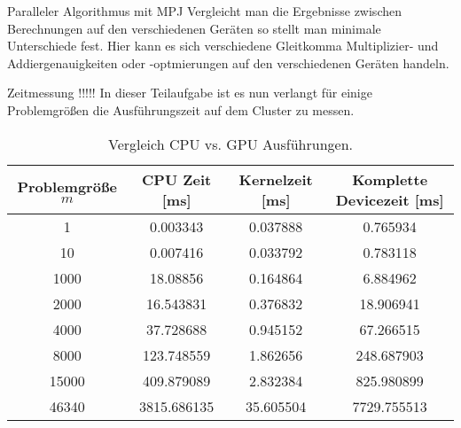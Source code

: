 \documentclass[
ngerman,
subtask=ruled %
]{tudaexercise}
\begin{document}
\begin{task}{Paralleler Algorithmus mit MPJ}
		Vergleicht man die Ergebnisse zwischen Berechnungen auf den verschiedenen Geräten so stellt man minimale Unterschiede fest. 
		Hier kann es sich verschiedene Gleitkomma Multiplizier- und Addiergenauigkeiten oder -optmierungen auf den verschiedenen Geräten handeln. 
	\end{task}
	
	\begin{task}{Zeitmessung}
		!!!!!
		In dieser Teilaufgabe ist es nun verlangt für einige Problemgrößen die Ausführungszeit auf dem Cluster zu messen.
		
		
		\begin{table}[H]
			\centering
			\begin{tabular}{|c|c|c|c|}
				\hline
				\textbf{Problemgröße} $m$ & \textbf{CPU Zeit} [ms] & \textbf{Kernelzeit} [ms] & \textbf{Komplette Devicezeit} [ms]  \\
				\hline
				1 & 0.003343 & 0.037888 & 0.765934 \\
				10 & 0.007416 & 0.033792 & 0.783118 \\
				1000 & 18.08856 & 0.164864 & 6.884962 \\
				2000 & 16.543831 & 0.376832 & 18.906941 \\
				4000 & 37.728688 & 0.945152 & 67.266515 \\
				8000 & 123.748559 & 1.862656 & 248.687903 \\
				15000 & 409.879089 & 2.832384 & 825.980899 \\
				46340 & 3815.686135 & 35.605504 & 7729.755513 \\
				\hline
			\end{tabular}
			
			
			\caption{Vergleich CPU vs. GPU Ausführungen.}
			\label{tab:data}
		\end{table}
		\begin{figure}[H]
\end{figure}
\end{task}
\end{document}
